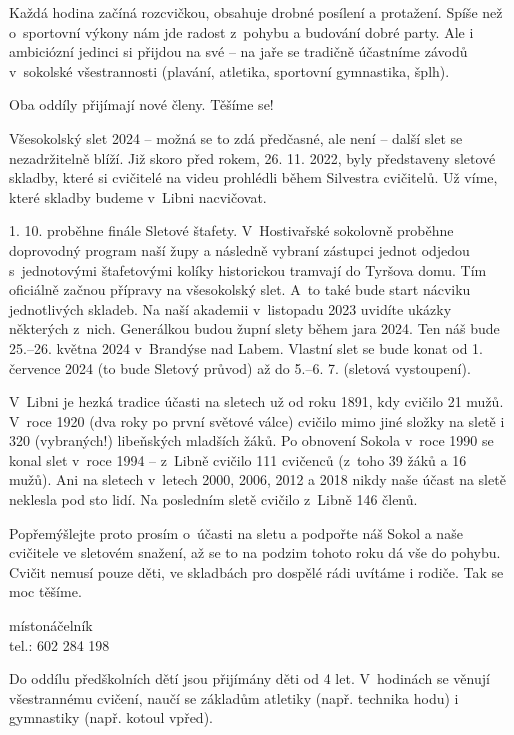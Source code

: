 \documentclass[11pt]{article}
\begin{document}
Každá hodina začíná rozcvičkou, obsahuje drobné posílení a protažení. Spíše než o~sportovní výkony nám jde radost z~pohybu a budování dobré party. Ale i ambiciózní jedinci si přijdou na své – na jaře se tradičně účastníme závodů v~sokolské všestrannosti (plavání, atletika, sportovní gymnastika, šplh).

Oba oddíly přijímají nové členy. Těšíme se!

\signature{Alena Krásová (Ája)}{}

Všesokolský slet 2024 – možná se to zdá předčasné, ale není – další slet se nezadržitelně blíží. Již skoro před rokem, 26. 11. 2022, byly představeny sletové skladby, které si cvičitelé na videu prohlédli během Silvestra cvičitelů. Už víme, které skladby budeme v~Libni nacvičovat.

1. 10. proběhne finále Sletové štafety. V~Hostivařské sokolovně proběhne doprovodný program naší župy a následně vybraní zástupci jednot odjedou s~jednotovými štafetovými kolíky historickou tramvají do Tyršova domu. Tím oficiálně začnou přípravy na všesokolský slet. A~to také bude start nácviku jednotlivých skladeb. Na naší akademii v~listopadu 2023 uvidíte ukázky některých z~nich. Generálkou budou župní slety během jara 2024. Ten náš bude 25.–26. května 2024 v~Brandýse nad Labem. Vlastní slet se bude konat od 1. července 2024 (to bude Sletový průvod) až do 5.–6. 7. (sletová vystoupení).

V~Libni je hezká tradice účasti na sletech už od roku 1891, kdy cvičilo 21 mužů. V~roce 1920 (dva roky po první světové válce) cvičilo mimo jiné složky na sletě i 320 (vybraných!) libeňských mladších žáků. Po obnovení Sokola v~roce 1990 se konal slet v~roce 1994 – z~Libně cvičilo 111 cvičenců (z~toho 39 žáků a 16 mužů). Ani na sletech v~letech 2000, 2006, 2012 a 2018 nikdy naše účast na sletě neklesla pod sto lidí. Na posledním sletě cvičilo z~Libně 146 členů.

Popřemýšlejte proto prosím o~účasti na sletu a podpořte náš Sokol a naše cvičitele ve sletovém snažení, až se to na podzim tohoto roku dá vše do pohybu. Cvičit nemusí pouze děti, ve skladbách pro dospělé rádi uvítáme i rodiče. Tak se moc těšíme.

\signature{Jiří Novák (Jirkan)}{místonáčelník\\tel.: 602 284 198}

\vspace*{24pt}

Do oddílu předškolních dětí jsou přijímány děti od 4 let. V~hodinách se věnují všestrannému cvičení, naučí se základům atletiky (např. technika hodu) i gymnastiky (např. kotoul vpřed).
\end{document}
